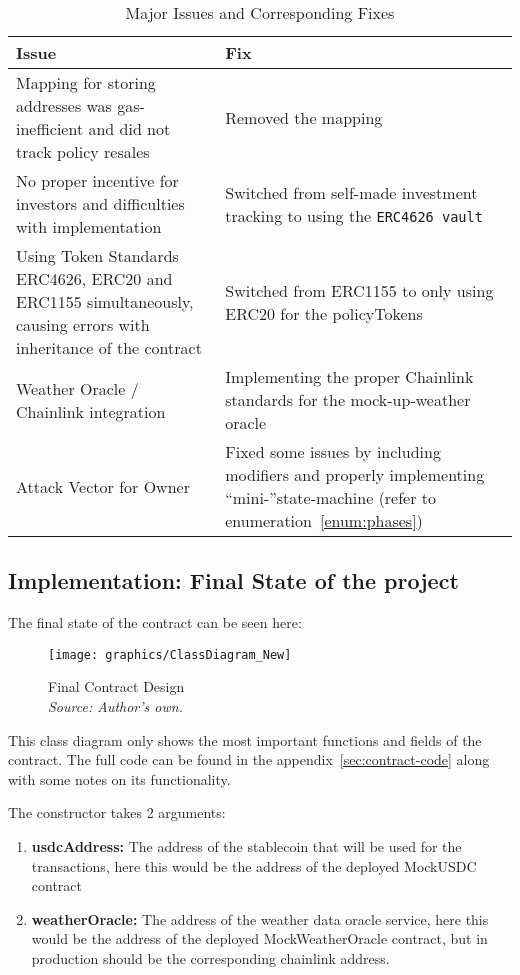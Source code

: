 \documentclass[11pt,a4paper]{article}
\begin{document}
		\begin{table}[H]
			\centering
			\caption{Major Issues and Corresponding Fixes}
			\label{tab:issues-fixes}
			\begin{tabular}{|p{0.42\textwidth}|p{}|}
				\hline
				\textbf{Issue} & \textbf{Fix} \\
				\hline
				Mapping for storing addresses was gas-inefficient and did not track policy resales & Removed the mapping \\
				\hline
				No proper incentive for investors and difficulties with implementation & Switched from self-made investment tracking to using the \texttt{ERC4626 vault} \\
				\hline
				Using Token Standards ERC4626, ERC20 and ERC1155 simultaneously, causing errors with inheritance of the contract & Switched from ERC1155 to only using ERC20 for the policyTokens \\
				\hline
				Weather Oracle / Chainlink integration & Implementing the proper Chainlink standards for the mock-up-weather oracle~\parencite{AggregatorV3Interface} \\
				\hline
				Attack Vector for Owner & Fixed some issues by including modifiers and properly implementing \enquote{mini-}state-machine (refer to enumeration~\ref{enum:phases}) \\
				\hline
			\end{tabular}
		\end{table}


		\subsection{Implementation: Final State of the project}\label{subsec:final-state}

		The final state of the contract can be seen here:

		\begin{figure}[H]
			\centering
			\texttt{[image: graphics/ClassDiagram\_New]}
			\caption{Final Contract Design \\ \textit{Source: Author's own.}}
			\label{fig:final-contract-design}
		\end{figure}

		This class diagram only shows the most important functions and fields of the contract.
		The full code can be found in the appendix~\ref{sec:contract-code} along with some notes on its functionality.

		The constructor takes 2 arguments:
		\begin{enumerate}[(1)]
			\item \textbf{usdcAddress:} The address of the stablecoin that will be used for the transactions, here this would be the address of the deployed MockUSDC contract
			\item \textbf{weatherOracle:} The address of the weather data oracle service, here this would be the address of the deployed MockWeatherOracle contract, but in production should be the corresponding chainlink address.
		\end{enumerate}
\end{document}

